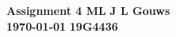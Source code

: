 \documentclass[a4paper,12pt]{article}
\newcommand\block[1]{\hspace*{#1}}
\begin{document}
\selectfont
\thispagestyle{empty}

{\Large \textbf{Assignment 4 ML}} \hfill {\Large \textbf{J L Gouws}}\\
\block{1.0cm} {\large \textbf{\today}} \hfill {\large \textbf{19G4436}}\\



\end{document}

